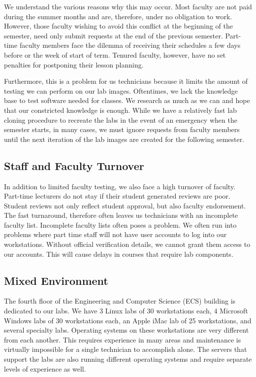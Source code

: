 We understand the various reasons why this may occur.  Most faculty are not paid during the summer months and are, therefore, under no obligation to work.  However, those faculty wishing to avoid this conflict at the beginning of the semester, need only submit requests at the end of the previous semester.  Part-time faculty members face the dilemma of receiving their schedules a few days before or the week of start of term.  Tenured faculty, however, have no set penalties for postponing their lesson planning.  

Furthermore, this is a problem for us technicians because it limits the amount of testing we can perform on our lab images.  Oftentimes, we lack the knowledge base to test software needed for classes.  We research as much as we can and hope that our constricted knowledge is enough.  While we have a relatively fast lab cloning procedure to recreate the labs in the event of an emergency when the semester starts, in many cases, we must ignore requests from faculty members until the next iteration of the lab images are created for the following semester. 

\subsection{Staff and Faculty Turnover}
In addition to limited faculty testing, we also face a high turnover of faculty.  Part-time lecturers do not stay if their student generated reviews are poor.  Student reviews not only reflect student approval, but also faculty endorsement.  The fast  turnaround, therefore often leaves us technicians with an incomplete faculty list.  Incomplete faculty lists often poses a problem.  We often run into problems where part time staff will not have user accounts to log into our workstations.  Without official verification details, we cannot grant them access to our accounts.  This will cause delays in courses that require lab components. 

\subsection{Mixed Environment}

The fourth floor of the Engineering and Computer Science (ECS) building is dedicated to our labs.  We have 3 Linux labs of 30 workstations each, 4 Microsoft Windows labs of 30 workstations each, an Apple iMac lab of 25 workstations, and several specialty labs.  Operating systems on these workstations are very different from each another.  This requires experience in many areas and maintenance is virtually impossible for a single technician to accomplish alone.  The servers that support the labs are also running different operating systems and require separate levels of experience as well. 

